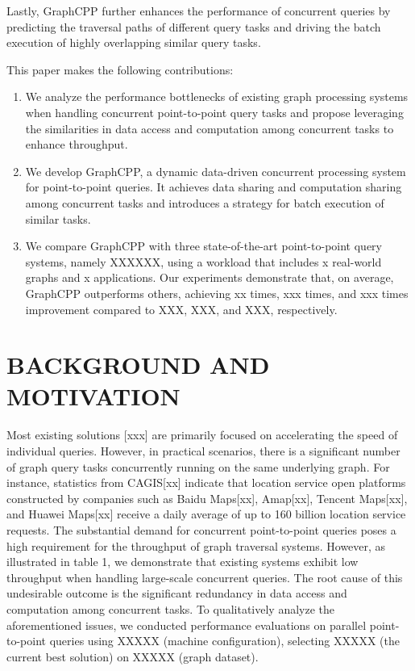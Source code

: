 \documentclass[lettersize,journal]{IEEEtran} %
\begin{document}
Lastly, GraphCPP further enhances the performance of concurrent queries by predicting the traversal paths of different query tasks and driving the batch execution of highly overlapping similar query tasks.

This paper makes the following contributions:
\begin{enumerate}
  \item{We analyze the performance bottlenecks of existing graph processing systems when handling concurrent point-to-point query tasks and propose leveraging the similarities in data access and computation among concurrent tasks to enhance throughput.}
  \item{We develop GraphCPP, a dynamic data-driven concurrent processing system for point-to-point queries. It achieves data sharing and computation sharing among concurrent tasks and introduces a strategy for batch execution of similar tasks.}
  \item{We compare GraphCPP with three state-of-the-art point-to-point query systems, namely XXXXXX, using a workload that includes x real-world graphs and x applications. Our experiments demonstrate that, on average, GraphCPP outperforms others, achieving xx times, xxx times, and xxx times improvement compared to XXX, XXX, and XXX, respectively.}
\end{enumerate}

\section{BACKGROUND AND MOTIVATION}
Most existing solutions [xxx] are primarily focused on accelerating the speed of individual queries. However, in practical scenarios, there is a significant number of graph query tasks concurrently running on the same underlying graph. For instance, statistics from CAGIS[xx] indicate that location service open platforms constructed by companies such as Baidu Maps[xx], Amap[xx], Tencent Maps[xx], and Huawei Maps[xx] receive a daily average of up to 160 billion location service requests. The substantial demand for concurrent point-to-point queries poses a high requirement for the throughput of graph traversal systems. However, as illustrated in table 1, we demonstrate that existing systems exhibit low throughput when handling large-scale concurrent queries. The root cause of this undesirable outcome is the significant redundancy in data access and computation among concurrent tasks. To qualitatively analyze the aforementioned issues, we conducted performance evaluations on parallel point-to-point queries using XXXXX (machine configuration), selecting XXXXX (the current best solution) on XXXXX (graph dataset).
\end{document}
